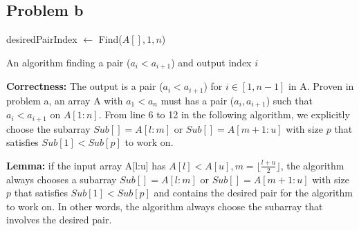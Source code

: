 \documentclass{article}
\begin{document}
\subsection{Problem b}
\begin{algorithm}[!ht]
\DontPrintSemicolon
{}
    desiredPairIndex $\leftarrow$ Find($A[], 1,n$)
      \;

\caption{An algorithm finding a pair ($a_i < a_{i+1}$) and output index $i$}
\end{algorithm}

\textbf{Correctness:} The output is a pair ($a_i<a_{i+1}$) for $i\in [1,n-1]$ in A. Proven in problem a, an array A with $a_1 < a_n$ must has a pair ($a_i,a_{i+1}$) such that $a_i<a_{i+1}$ on $A[1:n]$. From line 6 to 12 in the following algorithm, we explicitly choose the subarray $Sub[] = A[l:m]$ or $Sub[]=A[m+1:u]$ with size $p$ that satisfies $Sub[1] < Sub[p]$ to work on.

\textbf{Lemma:} if the input array A[l:u] has $A[l] < A[u], m=\lfloor \frac{l+u}{2}\rfloor$, the algorithm always chooses a subarray  $Sub[] = A[l:m]$ or $Sub[]=A[m+1:u]$ with size $p$ that satisfies $Sub[1] < Sub[p]$ and contains the desired pair for the algorithm to work on. In other words, the algorithm always choose the subarray that involves the desired pair.
\end{document}
